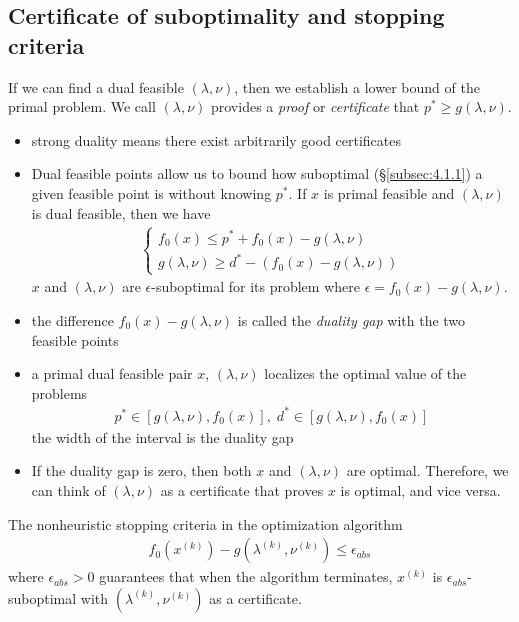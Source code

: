 \subsection{Certificate of suboptimality and stopping criteria}
If we can find a dual feasible $(\lambda,\nu)$, then we establish a lower bound of the primal problem.
We call $(\lambda,\nu)$ provides a \textit{proof} or \textit{certificate} that $p^\ast\ge g(\lambda,\nu)$.
\begin{itemize}
  \item strong duality means there exist arbitrarily good certificates
  \item Dual feasible points allow us to bound how suboptimal (\S\ref{subsec:4.1.1}) a given feasible point is without knowing $p^\ast$.
        If $x$ is primal feasible and $(\lambda,\nu)$ is dual feasible, then we have
        \begin{align*}
          \begin{cases}
            f_0(x)\le p^\ast+f_0(x)-g(\lambda,\nu)\\
            g(\lambda,\nu)\ge d^\ast-(f_0(x)-g(\lambda,\nu))
          \end{cases}
        \end{align*}
        \ie $x$ and $(\lambda,\nu)$ are $\epsilon$-suboptimal for its problem where $\epsilon=f_0(x)-g(\lambda,\nu)$.
  \item the difference $f_0(x)-g(\lambda,\nu)$ is called the \textit{duality gap} with the two feasible points
  \item a primal dual feasible pair $x$, $(\lambda,\nu)$ localizes the optimal value of the problems
        \begin{align*}
          p^\ast\in [g(\lambda,\nu),f_0(x)],\;d^\ast\in [g(\lambda,\nu),f_0(x)]
        \end{align*}
        the width of the interval is the duality gap
  \item If the duality gap is zero, then both $x$ and $(\lambda,\nu)$ are optimal.
        Therefore, we can think of $(\lambda,\nu)$ as a certificate that proves $x$ is optimal, and vice versa.
\end{itemize}
The nonheuristic stopping criteria in the optimization algorithm
\begin{align*}
  f_0(x^{(k)})-g(\lambda^{(k)},\nu^{(k)})\le\epsilon_{abs}
\end{align*}
where $\epsilon_{abs}>0$ guarantees that when the algorithm terminates, $x^{(k)}$ is $\epsilon_{abs}$-suboptimal with $(\lambda^{(k)},\nu^{(k)})$ as a certificate.
